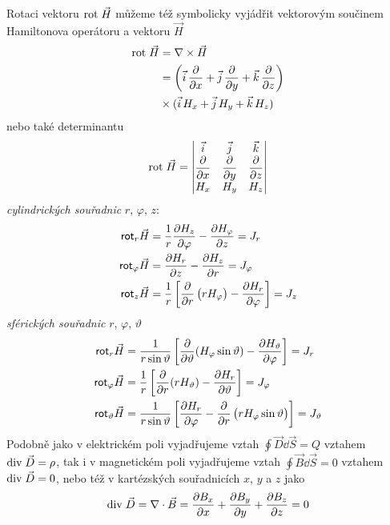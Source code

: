       Rotaci vektoru $\mathrm{rot}\;\vec{H}$ můžeme též symbolicky vyjádřit vektorovým součinem Hamiltonova
      operátoru a vektoru $\vec{H}$
      \begin{align*}
        \mathrm{rot}\;\vec{H} &= \nabla\times\vec{H}                                                      \\                                           
                &= \left(\vec{i}\,\dfrac{\partial  }{\partial x} + 
                   \vec{j}\,\dfrac{\partial  }{\partial y} + \vec{k}\,\dfrac{\partial  }{\partial z}\right)                       \\
                & \times(\vec{i}\,H_x + \vec{j}\,H_y + \vec{k}\,H_z)
      \end{align*}
      nebo také determinantu
      \begin{equation}\label{TEMP:eq_amp_z8}
        \mathrm{rot}\;\vec{H} = \begin{vmatrix}
                    \vec{i}       & \vec{j}      & \vec{k}      \\
                    \dfrac{\partial  }{\partial x}  & \dfrac{\partial  }{\partial y} & \dfrac{\partial  }{\partial z} \\ 
                    H_x          & H_y         & H_z         \\
                  \end{vmatrix}      
      \end{equation}  
      \emph{cylindrických souřadnic} $r$, $\varphi$, $z$:
      \begin{align}\label{TEMP:eq_amp_z9}
        \textsf{rot}_r\vec{H}       
          &= \frac{1}{r}\dfrac{\partial H_z}{\partial \varphi} - \dfrac{\partial H_\varphi}{\partial z} = J_r           \nonumber \\ 
        \textsf{rot}_\varphi\vec{H} 
          &= \dfrac{\partial H_r}{\partial z} - \dfrac{\partial H_z}{\partial r}                        = J_\varphi     \nonumber \\
        \textsf{rot}_z\vec{H}       
          &= \frac{1}{r}\left[\dfrac{\partial  }{\partial r}
             \left(rH_\varphi\right)-\dfrac{\partial H_r}{\partial \varphi}\right]   = J_z
      \end{align} 
      \emph{sférických souřadnic} $r$, $\varphi$, $\vartheta$ 
      \begin{align}\label{TEMP:eq_amp_z10}
        \textsf{rot}_r\vec{H}        
           &= \frac{1}{r\sin\vartheta}\left[\dfrac{\partial  }{\partial \vartheta}(H_\varphi\sin\vartheta) - 
              \dfrac{\partial H_\vartheta}{\partial \varphi}\right]                     = J_r           \nonumber \\ 
        \textsf{rot}_\varphi\vec{H}   
           &= \frac{1}{r}\left[\dfrac{\partial  }{\partial r}(rH_\vartheta) - 
              \dfrac{\partial H_r}{\partial \vartheta}\right]                           = J_\varphi     \nonumber \\
        \textsf{rot}_\vartheta\vec{H} 
           &= \frac{1}{r\sin\vartheta}\left[\dfrac{\partial H_r}{\partial \varphi} -
              \dfrac{\partial  }{\partial r}\left(rH_\varphi\sin\vartheta\right)\right] = J_\vartheta    
    \end{align} 
      Podobně jako v elektrickém poli vyjadřujeme vztah $\oint\vec{D}\dd{\vec{S}} = Q$ vztahem 
      $\mathrm{div}\;\vec{D}
      = \rho$, tak i v magnetickém poli vyjadřujeme vztah $\oint\vec{B}\dd{\vec{S}} = 0$ vztahem
      $\mathrm{div}\;\vec{D} = 0$, nebo též v kartézských souřadnicích $x$, $y$ a $z$ jako $$\mathrm{div}\;\vec{D} =
      \nabla\cdot\vec{B} = \dfrac{\partial B_x}{\partial x} + \dfrac{\partial B_y}{\partial y} + \dfrac{\partial B_z}{\partial z} = 0$$
                     
